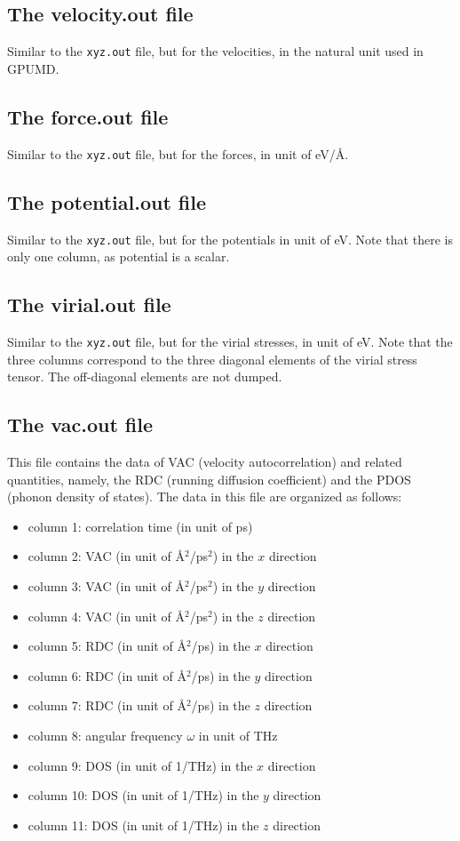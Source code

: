 \documentclass[12pt,a4paper]{report}
\begin{document}
\subsection{The velocity.out file}

Similar to the \verb"xyz.out" file, but for the velocities, in the natural unit used in GPUMD.

\subsection{The force.out file}

Similar to the \verb"xyz.out" file, but for the forces, in unit of eV/\AA.

\subsection{The potential.out file}

Similar to the \verb"xyz.out" file, but for the potentials in unit of eV. Note that there is
only one column, as potential is a scalar.

\subsection{The virial.out file}

Similar to the \verb"xyz.out" file, but for the virial stresses, in unit of eV.
Note that the three columns correspond to the three diagonal elements
of the virial stress tensor. The off-diagonal elements are not dumped.



\subsection{The vac.out file}
This file contains the data of VAC (velocity autocorrelation) and related quantities, namely, the RDC (running diffusion coefficient) and the PDOS (phonon density of states). The data in this file are organized as follows:
\begin{itemize}
\item column 1: correlation time (in unit of ps)
\item column 2: VAC (in unit of \AA$^2$/ps$^2$) in the $x$ direction
\item column 3: VAC (in unit of \AA$^2$/ps$^2$) in the $y$ direction
\item column 4: VAC (in unit of \AA$^2$/ps$^2$) in the $z$ direction
\item column 5: RDC (in unit of \AA$^2$/ps) in the $x$ direction
\item column 6: RDC (in unit of \AA$^2$/ps) in the $y$ direction
\item column 7: RDC (in unit of \AA$^2$/ps) in the $z$ direction
\item column 8: angular frequency $\omega$ in unit of THz
\item column 9: DOS (in unit of 1/THz) in the $x$ direction
\item column 10: DOS (in unit of 1/THz) in the $y$ direction
\item column 11: DOS (in unit of 1/THz) in the $z$ direction
\end{itemize}
\end{document}

